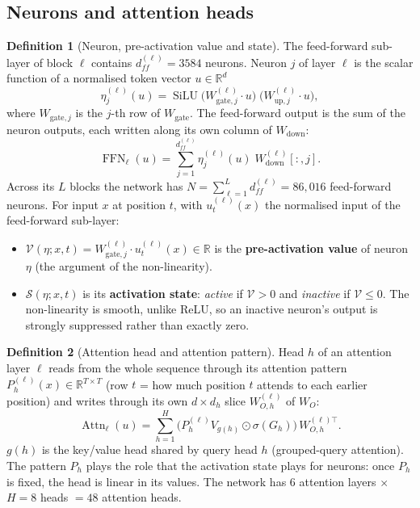 \documentclass[10pt,a4paper]{article}
\newcommand{\op}[1]{\operatorname{#1}}
\theoremstyle{definition}
\newtheorem{definition}{Definition}[section]
\begin{document}
\subsection{Neurons and attention heads}
\begin{definition}[Neuron, pre-activation value and state]
The feed-forward sub-layer of block $\ell$ contains $d_{ff}^{(\ell)}=3584$ neurons. Neuron $j$ of layer $\ell$ is the scalar function of a normalised token vector $u\in\mathbb{R}^{d}$
\begin{equation}
  \eta^{(\ell)}_j(u) = \op{SiLU}\big(W^{(\ell)}_{\mathrm{gate},j}\cdot u\big)\;\big(W^{(\ell)}_{\mathrm{up},j}\cdot u\big),
\end{equation}
where $W_{\mathrm{gate},j}$ is the $j$-th row of $W_{\mathrm{gate}}$. The feed-forward output is the sum of the neuron outputs, each written along its own column of $W_{\mathrm{down}}$:
\begin{equation}
  \op{FFN}_\ell(u) = \sum_{j=1}^{d_{ff}^{(\ell)}} \eta^{(\ell)}_j(u)\;W^{(\ell)}_{\mathrm{down}}[:,j].
\end{equation}
Across its $L$ blocks the network has $N=\sum_{\ell=1}^{L} d_{ff}^{(\ell)}=86{,}016$ feed-forward neurons. For input $x$ at position $t$, with $u^{(\ell)}_t(x)$ the normalised input of the feed-forward sub-layer:
\begin{itemize}
\item $\mathcal{V}(\eta;x,t)=W^{(\ell)}_{\mathrm{gate},j}\cdot u^{(\ell)}_t(x)\in\mathbb{R}$ is the \textbf{pre-activation value} of neuron $\eta$ (the argument of the non-linearity).
\item $\mathcal{S}(\eta;x,t)$ is its \textbf{activation state}: \emph{active} if $\mathcal{V}>0$ and \emph{inactive} if $\mathcal{V}\le 0$. The non-linearity is smooth, unlike ReLU, so an inactive neuron's output is strongly suppressed rather than exactly zero.
\end{itemize}
\end{definition}
\begin{definition}[Attention head and attention pattern]
Head $h$ of an attention layer $\ell$ reads from the whole sequence through its attention pattern $P^{(\ell)}_h(x)\in\mathbb{R}^{T\times T}$ (row $t$ = how much position $t$ attends to each earlier position) and writes through its own $d\times d_h$ slice $W^{(\ell)}_{O,h}$ of $W_O$:
\begin{equation}
  \op{Attn}_\ell(u) = \sum_{h=1}^{H} \big(P^{(\ell)}_h V_{g(h)}\odot\sigma(G_h)\big)\,W^{(\ell)\top}_{O,h}.
\end{equation}
$g(h)$ is the key/value head shared by query head $h$ (grouped-query attention). The pattern $P_h$ plays the role that the activation state plays for neurons: once $P_h$ is fixed, the head is linear in its values. The network has 6 attention layers $\times$ $H=8$ heads $=48$ attention heads.
\end{definition}
\end{document}
